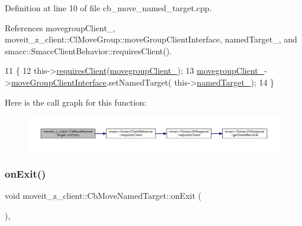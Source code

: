 Definition at line 10 of file cb\+\_\+move\+\_\+named\+\_\+target.\+cpp.



References movegroup\+Client\+\_\+, moveit\+\_\+z\+\_\+client\+::\+Cl\+Move\+Group\+::move\+Group\+Client\+Interface, named\+Target\+\_\+, and smacc\+::\+Smacc\+Client\+Behavior\+::requires\+Client().


\begin{DoxyCode}
11 \{
12     this->\hyperlink{classsmacc_1_1SmaccClientBehavior_a917f001e763a1059af337bf4e164f542}{requiresClient}(\hyperlink{classmoveit__z__client_1_1CbMoveNamedTarget_a1caf87b542890eb9181b04dc2271ef65}{movegroupClient\_});
13     \hyperlink{classmoveit__z__client_1_1CbMoveNamedTarget_a1caf87b542890eb9181b04dc2271ef65}{movegroupClient\_}->\hyperlink{classmoveit__z__client_1_1ClMoveGroup_af86e046b837be0ef4afa9893d8808f20}{moveGroupClientInterface}.setNamedTarget(
      this->\hyperlink{classmoveit__z__client_1_1CbMoveNamedTarget_a84a8aadc460b4a68eae22d25479c2bce}{namedTarget\_});
14 \}
\end{DoxyCode}
Here is the call graph for this function\+:
\nopagebreak
\begin{figure}[H]
\begin{center}
\leavevmode
\includegraphics[width=350pt]{classmoveit__z__client_1_1CbMoveNamedTarget_ad84bcf4ea514c0cdc3550ca41ff77d69_cgraph}
\end{center}
\end{figure}
\mbox{\label{classmoveit__z__client_1_1CbMoveNamedTarget_ab91985b232e1185b4b102bb309f65ffc}} 
\subsubsection{\texorpdfstring{on\+Exit()}{onExit()}}
{\footnotesize\ttfamily void moveit\+\_\+z\+\_\+client\+::\+Cb\+Move\+Named\+Target\+::on\+Exit (\begin{DoxyParamCaption}{ }\end{DoxyParamCaption})\hspace{0.3cm}{\ttfamily [override]}, {\ttfamily [virtual]}}



